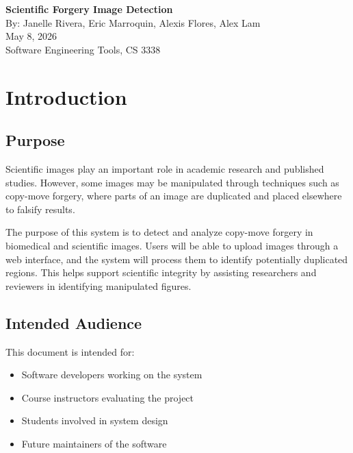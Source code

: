 \documentclass[12pt]{article}
\begin{document}
\begin{center}
    \vspace*{2cm}
    {\LARGE \textbf{Scientific Forgery Image Detection}} \\[1em]
    {\large By: Janelle Rivera, Eric Marroquin, Alexis Flores, Alex Lam} \\[0.5em]
    {\large May 8, 2026} \\[0.5em]
    {\large Software Engineering Tools, CS 3338}
\end{center}

\vspace{2cm}

\tableofcontents
\newpage

\section{Introduction}

\subsection{Purpose}

Scientific images play an important role in academic research and published studies. However, some images may be manipulated through techniques such as copy-move forgery, where parts of an image are duplicated and placed elsewhere to falsify results.

The purpose of this system is to detect and analyze copy-move forgery in biomedical and scientific images. Users will be able to upload images through a web interface, and the system will process them to identify potentially duplicated regions. This helps support scientific integrity by assisting researchers and reviewers in identifying manipulated figures.

\subsection{Intended Audience}

This document is intended for:
\begin{itemize}[noitemsep]
    \item Software developers working on the system
    \item Course instructors evaluating the project
    \item Students involved in system design
    \item Future maintainers of the software
\end{itemize}
\end{document}
